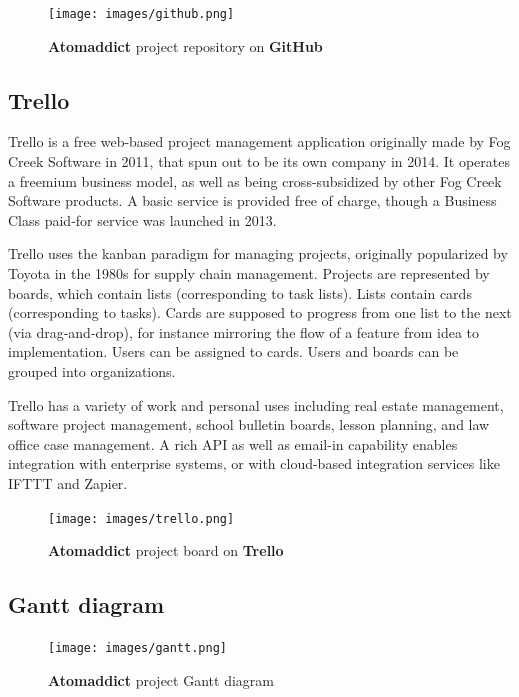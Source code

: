\documentclass[12pt]{article}
\begin{document}
\begin{figure}[H]
    \centering
    \texttt{[image: images/github.png]}
    \caption{\textbf{Atomaddict} project repository on \textbf{GitHub}}
    \label{fig:github}
\end{figure}


\subsection{Trello}
Trello is a free web-based project management application originally made by Fog Creek Software in 2011, that spun out to be its own company in 2014.
It operates a freemium business model, as well as being cross-subsidized by other Fog Creek Software products. A basic service is provided free of charge, though a Business Class paid-for service was launched in 2013.

Trello uses the kanban paradigm for managing projects, originally popularized by Toyota in the 1980s for supply chain management. Projects are represented by boards, which contain lists (corresponding to task lists). Lists contain cards (corresponding to tasks). Cards are supposed to progress from one list to the next (via drag-and-drop), for instance mirroring the flow of a feature from idea to implementation. Users can be assigned to cards. Users and boards can be grouped into organizations.

Trello has a variety of work and personal uses including real estate management, software project management, school bulletin boards, lesson planning, and law office case management. A rich API as well as email-in capability enables integration with enterprise systems, or with cloud-based integration services like IFTTT and Zapier.~\cite{wiki:trello}

\begin{figure}[H]
    \centering
    \texttt{[image: images/trello.png]}
    \caption{\textbf{Atomaddict} project board on \textbf{Trello}}
    \label{fig:trello}
\end{figure}


\subsection{Gantt diagram}

\begin{figure}[H]
    \centering
    \texttt{[image: images/gantt.png]}
    \caption{\textbf{Atomaddict} project Gantt diagram}
\end{figure}
\end{document}
